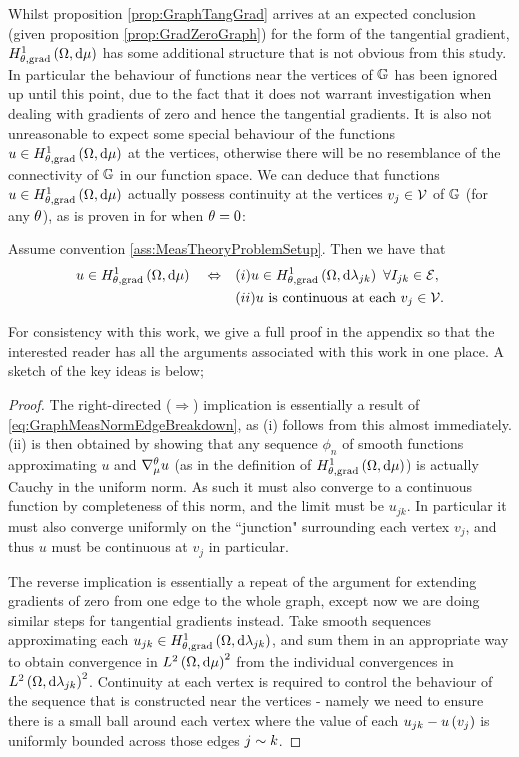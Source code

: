 Whilst proposition \ref{prop:GraphTangGrad} arrives at an expected conclusion (given proposition \ref{prop:GradZeroGraph}) for the form of the tangential gradient, $H^1_{\theta, \mathrm{grad}}\left( \Omega, \mathrm{d}\mu \right)$ has some additional structure that is not obvious from this study.
In particular the behaviour of functions near the vertices of $\mathbb{G}$ has been ignored up until this point, due to the fact that it does not warrant investigation when dealing with gradients of zero and hence the tangential gradients.
It is also not unreasonable to expect some special behaviour of the functions $u\in H^1_{\theta, \mathrm{grad}}\left( \Omega, \mathrm{d}\mu \right)$ at the vertices, otherwise there will be no resemblance of the connectivity of $\mathbb{G}$ in our function space.
We can deduce that functions $u\in H^1_{\theta, \mathrm{grad}}\left( \Omega, \mathrm{d}\mu \right)$ actually possess continuity at the vertices $v_j\in \mathcal{V}$ of $\mathbb{G}$ (for any $\theta$), as is proven in  for when $\theta=0$:
\begin{theorem} \label{thm:CharOfGradSob}
	Assume convention \ref{ass:MeasTheoryProblemSetup}.
	Then we have that
	\begin{align*}
		u\in H^1_{\theta, \mathrm{grad}}\left( \Omega, \mathrm{d}\mu \right) \quad\Leftrightarrow\quad 
		& (i) u\in H^1_{\theta, \mathrm{grad}}\left( \Omega, \mathrm{d}\lambda_{jk} \right) \ \forall I_{jk}\in \mathcal{E}, \\
		& (ii) u \text{ is continuous at each } v_j\in \mathcal{V}.
	\end{align*}
\end{theorem}
For consistency with this work, we give a full proof in the appendix so that the interested reader has all the arguments associated with this work in one place.
A sketch of the key ideas is below;
\begin{proof}
	The right-directed ($\Rightarrow$) implication is essentially a result of \eqref{eq:GraphMeasNormEdgeBreakdown}, as (i) follows from this almost immediately.
	(ii) is then obtained by showing that any sequence $\phi_n$ of smooth functions approximating $u$ and $\nabla^{\theta}_\mu u$ (as in the definition of $H^1_{\theta, \mathrm{grad}}\left( \Omega, \mathrm{d}\mu \right)$) is actually Cauchy in the uniform norm.
	As such it must also converge to a continuous function by completeness of this norm, and the limit must be $u_{jk}$.
	In particular it must also converge uniformly on the ``junction" surrounding each vertex $v_j$, and thus $u$ must be continuous at $v_j$ in particular. \newline
	
	The reverse implication is essentially a repeat of the argument for extending gradients of zero from one edge to the whole graph, except now we are doing similar steps for tangential gradients instead.
	Take smooth sequences approximating each $u_{jk}\in H^1_{\theta, \mathrm{grad}}\left( \Omega, \mathrm{d}\lambda_{jk} \right)$, and sum them in an appropriate way to obtain convergence in $L^{2}\left( \Omega,\mathrm{d}\mu \right)^2$ from the individual convergences in $L^{2}\left( \Omega,\mathrm{d}\lambda_{jk} \right)^2$.
	Continuity at each vertex is required to control the behaviour of the sequence that is constructed near the vertices - namely we need to ensure there is a small ball around each vertex where the value of each $u_{jk} - u\left( v_j \right)$ is uniformly bounded across those edges $j\sim k$.
\end{proof}